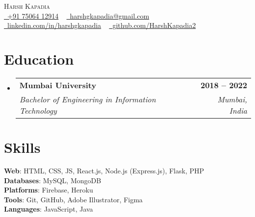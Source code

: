 \documentclass[letterpaper,11pt]{article}
\makeatletter
\newcommand{\resumeSubheading}[4]{
  \vspace{-2pt}\item
    \begin{tabular*}{1.0\textwidth}[t]{l@{\extracolsep{\fill}}r}
      \textbf{#1} & \textbf{\small #2} \\
      \textit{\small#3} & \textit{\small #4} \\
    \end{tabular*}\vspace{-7pt}
}
\newcommand{\resumeSubHeadingListStart}{\begin{itemize}[leftmargin=0.0in, label={}]}
\newcommand{\resumeSubHeadingListEnd}{\end{itemize}}
\makeatother
\begin{document}

\begin{center}
    {\Huge \scshape Harsh Kapadia} \\ \vspace{2pt}
    \small
    \faPhone \href{mailto:harshgkapadia@gmail.com}{\raisebox{-0.1\height}\ +91 75064 12914} ~ \faEnvelope \href{mailto:harshgkapadia@gmail.com}{\raisebox{-0.2\height}\  harshgkapadia@gmail.com} ~ 
    \faLinkedin \href{https://linkedin.com/in/harshgkapadia/}{\raisebox{-0.2\height}\ linkedin.com/in/harshgkapadia} ~
    \faGithub \href{https://github.com/HarshKapadia2}{\raisebox{-0.2\height}\ github.com/HarshKapadia2}
    \vspace{-8pt}
\end{center}


\section{Education}
  \resumeSubHeadingListStart
    \resumeSubheading
        {Mumbai University}{2018 -- 2022}
        {Bachelor of Engineering in Information Technology}{Mumbai, India}
    \resumeSubHeadingListEnd


\section{Skills}
    \begin{itemize}[leftmargin=0.2in, label={}]
    {\item{
        \textbf{Web}: HTML, CSS, JS, React.js, Node.js (Express.js), Flask, PHP \\
        \textbf{Databases}: MySQL, MongoDB \\
        \textbf{Platforms}: Firebase, Heroku \\
        \textbf{Tools}: Git, GitHub, Adobe Illustrator, Figma \\
        \textbf{Languages}: JavaScript, Java
    }}
    \end{itemize}
\vspace{-16pt}
\end{document}
